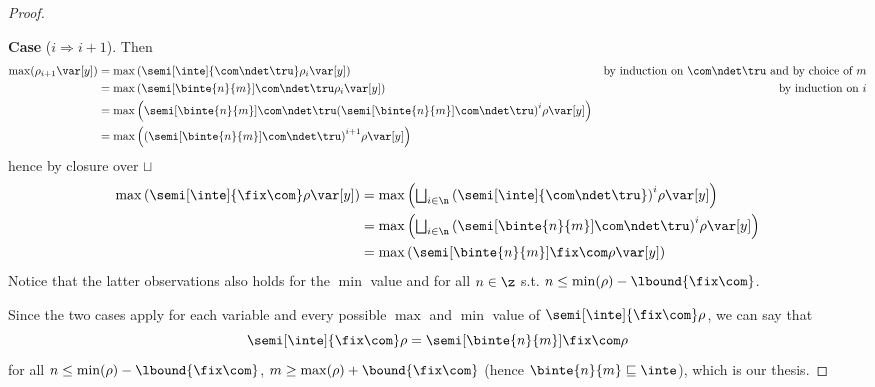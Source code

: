 \begin{proof}
\begin{enumerate}[label=(\roman*)]
    \noindent
    \textbf{Case} (\(i \Rightarrow i+1\)).  Then
    \begin{align*}
      \max(\rho_{i+1}\var[y]) & = \max\left(\semi[\inte]{\com\ndet\tru}\rho_i\var[y]\right)& \text{by induction on } \com \ndet \tru \text{ and by choice of } m \\ 
                              & = \max\left(\semi[\binte{n}{m}]{\com\ndet\tru}\rho_i\var[y]\right) & \text{by induction on } i \\
                              & = \max\left(\semi[\binte{n}{m}]{\com\ndet\tru}{\left(\semi[\binte{n}{m}]{\com\ndet\tru}\right)}^i\rho\var[y]\right) \\
                 & = \max\left({\left(\semi[\binte{n}{m}]{\com\ndet\tru}\right)}^{i+1}\rho\var[y]\right)
    \end{align*}
    hence by closure over \(\sqcup\)
    \begin{align*}
      \max\left(\semi[\inte]{\fix\com}\rho\var[y]\right)
      & =
        \max\left(\textstyle\bigsqcup_{i\in\n}{\left(\semi[\inte]{\com\ndet\tru}\right)}^i\rho\var[y]\right) \\
      & =
        \max\left(\textstyle\bigsqcup_{i\in\n}{\left(\semi[\binte{n}{m}]{\com\ndet\tru}\right)}^i\rho\var[y]\right) \\
      & =
        \max\left(\semi[\binte{n}{m}]{\fix\com}\rho\var[y]\right)
    \end{align*}
    Notice that the latter observations also holds for the \(\min\)
    value and for all \(n \in \z\) s.t.
    \({n \leq \min(\rho) - \lbound{\fix\com}}\).
  \end{enumerate}
  Since the two cases apply for each variable and every possible
  \(\max\) and \(\min\) value of \(\semi[\inte]{\fix\com}\rho\), we
  can say that
  \begin{equation*}
    \semi[\inte]{\fix\com}\rho = \semi[\binte{n}{m}]{\fix\com}\rho
  \end{equation*}
  for all \(n \leq \min(\rho) - \lbound{\fix\com}\),
  \(m \geq \max(\rho) + \bound{\fix\com}\) (hence
  \(\binte{n}{m} \sqsubseteq \inte\)), which is our thesis.
\end{proof}
